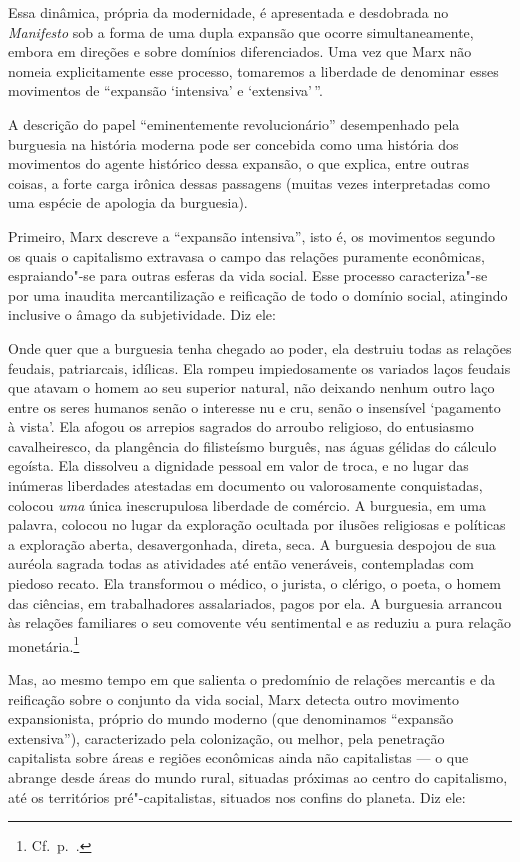 Essa dinâmica, própria da modernidade, é apresentada e desdobrada no
\textit{Manifesto} sob a forma de uma dupla expansão que ocorre
simultaneamente, embora em direções e sobre domínios diferenciados. Uma
vez que Marx não nomeia explicitamente esse processo, tomaremos a
liberdade de denominar esses movimentos de “expansão ‘intensiva’ e
‘extensiva’\,”.

A descrição do papel “eminentemente revolucionário” desempenhado pela
burguesia na história moderna pode ser concebida como uma história dos
movimentos do agente histórico dessa expansão, o que explica, entre
outras coisas, a forte carga irônica dessas passagens (muitas vezes
interpretadas como uma espécie de apologia da burguesia).

Primeiro, Marx descreve a ``expansão intensiva'', isto é, os movimentos
segundo os quais o capitalismo extravasa o campo das relações puramente
econômicas, espraiando"-se para outras esferas da vida social. Esse
processo caracteriza"-se por uma inaudita mercantilização e reificação
de todo o domínio social, atingindo inclusive o âmago da subjetividade.
Diz ele: 

\begin{hedraquote} 
Onde quer que a burguesia tenha chegado ao poder, ela destruiu todas as
relações feudais, patriarcais, idílicas. Ela rompeu impiedosamente os
variados laços feudais que atavam o homem ao seu superior natural,
não deixando nenhum outro laço entre os seres humanos senão o interesse
nu e cru, senão o insensível ‘pagamento à vista’. Ela afogou os
arrepios sagrados do arroubo religioso, do entusiasmo cavalheiresco, da
plangência do filisteísmo burguês, nas águas gélidas do cálculo
egoísta. Ela dissolveu a dignidade pessoal em valor de troca, e no
lugar das inúmeras liberdades atestadas em documento ou valorosamente
conquistadas, colocou \textit{uma} única inescrupulosa liberdade de
comércio. A burguesia, em uma palavra, colocou no lugar da exploração
ocultada por ilusões religiosas e políticas a exploração aberta,
desavergonhada, direta, seca. A burguesia despojou de sua auréola
sagrada todas as atividades até então veneráveis, contempladas com
piedoso recato. Ela transformou o médico, o jurista, o clérigo, o
poeta, o homem das ciências, em trabalhadores assalariados, pagos por ela.
A burguesia arrancou às relações familiares o seu comovente véu
sentimental e as reduziu a pura relação monetária.\footnote{ Cf.~p.~\pageref{3}.}
\end{hedraquote} 

Mas, ao mesmo tempo em que salienta o predomínio de relações mercantis e
da reificação sobre o conjunto da vida social, Marx detecta outro
movimento expansionista, próprio do mundo moderno (que denominamos
“expansão extensiva”), caracterizado pela colonização, ou melhor, pela
penetração capitalista sobre áreas e regiões econômicas ainda não
capitalistas --- o que abrange desde áreas do mundo rural, situadas
próximas ao centro do capitalismo, até os territórios
pré"-capitalistas, situados nos confins do planeta. Diz ele:

